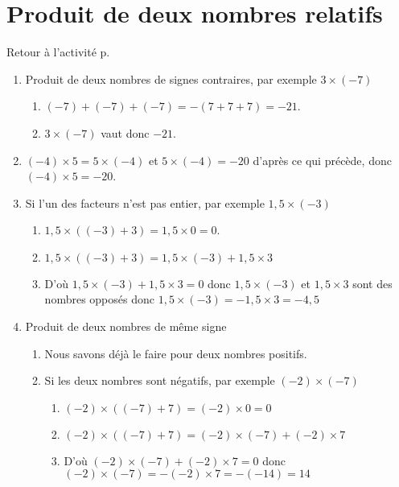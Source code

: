  \label{corrN1activite003}
\section*{Produit de deux nombres relatifs}
Retour à l'activité p. \hyperref[N1activite003]{\pageref{N1activite003}}

\begin{enumerate}
    \item Produit de deux nombres de signes contraires, par exemple $3\times(-7)$
    \begin{enumerate}
        \item $(-7)+(-7)+(-7) = -(7+7+7) = -21$.
        \item $3\times (-7)$ vaut donc $-21$.
    \end{enumerate}
    \item $(-4)\times 5= 5\times (-4)$ et $5\times (-4) = -20$ d'après ce qui précède, donc $(-4)\times 5 = -20$.
    \item Si l'un des facteurs n'est pas entier, par exemple $1,5\times (-3)$
    \begin{enumerate}
        \item $1,5\times ((-3)+3) = 1,5\times 0 = 0$.
        \item $1,5\times ((-3)+3) = 1,5\times (-3) + 1,5\times 3$ 
        \item D'où $1,5\times (-3) + 1,5\times 3 = 0 $ donc $1,5\times (-3)$ et $1,5\times 3$ sont des nombres opposés donc $1,5\times (-3) = - 1,5\times 3 = -4,5$
    \end{enumerate}
    \item Produit de deux nombres de même signe
    \begin{enumerate}
        \item Nous savons déjà le faire pour deux nombres positifs.
        \item Si les deux nombres sont négatifs, par exemple $(-2)\times (-7)$
        \begin{enumerate}
            \item $(-2)\times ((-7)+7) = (-2)\times 0 = 0$
            \item $(-2)\times ((-7)+7) = (-2)\times (-7) + (-2)\times 7$
            \item D'où $(-2)\times (-7) + (-2)\times 7=0$ donc $(-2)\times (-7) = - (-2)\times 7 = -(-14) = 14$
        \end{enumerate}
    \end{enumerate}
\end{enumerate}
